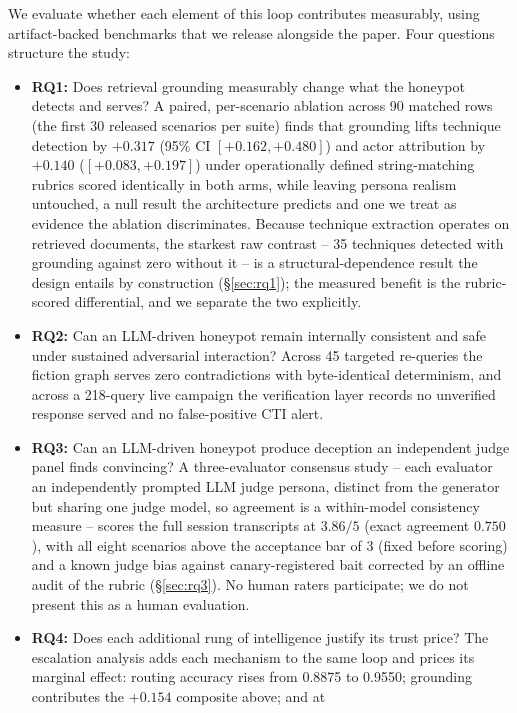 We evaluate whether each element of this loop contributes measurably,
using
artifact-backed benchmarks that we release alongside the paper. Four
questions structure the study:
\begin{itemize}
\item \textbf{RQ1:} Does retrieval grounding measurably change what the
honeypot detects and serves? A paired, per-scenario ablation across 90
matched rows (the first 30 released scenarios per suite) finds that
grounding lifts technique detection by $+0.317$ (95\% CI $[+0.162,
+0.480]$) and actor attribution by $+0.140$ ($[+0.083, +0.197]$) under
operationally defined string-matching rubrics scored identically in both
arms, while leaving persona realism untouched, a null result the
architecture predicts and one we treat as evidence the ablation
discriminates. Because technique extraction operates on retrieved
documents, the starkest raw contrast -- 35 techniques detected with
grounding against zero without it -- is a structural-dependence result
the design entails by construction (\S\ref{sec:rq1}); the measured
benefit is the rubric-scored differential, and we separate the two
explicitly.
\item \textbf{RQ2:} Can an LLM-driven honeypot remain internally consistent
and safe under sustained adversarial interaction? Across 45 targeted
re-queries the fiction graph serves zero contradictions with byte-identical
determinism, and across a 218-query live campaign the verification layer
records no unverified response served and no false-positive CTI alert.
\item \textbf{RQ3:} Can an LLM-driven honeypot produce deception an
independent judge panel finds convincing? A three-evaluator consensus
study -- each evaluator an independently prompted LLM judge persona,
distinct from the generator but sharing one judge model, so agreement is
a within-model consistency measure -- scores the full session
transcripts at $3.86/5$ (exact agreement $0.750$), with all eight
scenarios above the acceptance bar of 3 (fixed before scoring) and a
known judge bias against canary-registered bait corrected by an offline
audit of the rubric (\S\ref{sec:rq3}). No human raters participate; we
do not present this as a human evaluation.
\item \textbf{RQ4:} Does each additional rung of intelligence justify its
trust price? The escalation analysis adds each mechanism
to the same
loop and prices its marginal effect: routing accuracy rises from 0.8875
to 0.9550; grounding contributes the $+0.154$ composite above; and at

\end{itemize}
